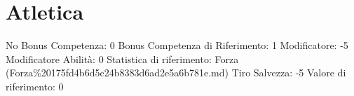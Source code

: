 \section{Atletica}\label{atletica}

\begin{description}
\tightlist
\item[Tags: ABI]
No Bonus Competenza: 0 Bonus Competenza di Riferimento: 1 Modificatore:
-5 Modificatore Abilità: 0 Statistica di riferimento: Forza
(Forza\%20175fd4b6d5c24b8383d6ad2e5a6b781e.md) Tiro Salvezza: -5 Valore
di riferimento: 0
\end{description}
